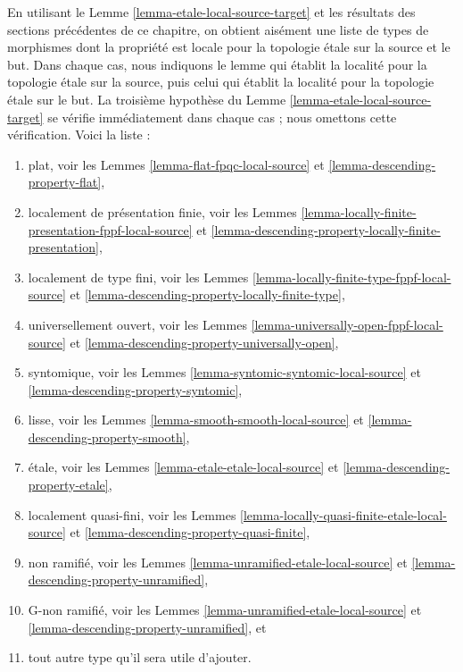 \begin{remark}
\label{remark-list-local-source-target}
En utilisant le Lemme \ref{lemma-etale-local-source-target} et les résultats
des sections précédentes de ce chapitre, on obtient aisément une liste de
types de morphismes dont la propriété est locale pour la topologie \'etale sur
la source et le but. Dans chaque cas, nous indiquons le lemme qui établit la
localité pour la topologie \'etale sur la source, puis celui qui établit la
localité pour la topologie \'etale sur le but. La troisième hypothèse du
Lemme \ref{lemma-etale-local-source-target} se vérifie immédiatement dans
chaque cas ; nous omettons cette vérification. Voici la liste :
\begin{enumerate}
\item plat, voir les Lemmes \ref{lemma-flat-fpqc-local-source} et
\ref{lemma-descending-property-flat},
\item localement de présentation finie, voir les Lemmes
\ref{lemma-locally-finite-presentation-fppf-local-source} et
\ref{lemma-descending-property-locally-finite-presentation},
\item localement de type fini, voir les Lemmes
\ref{lemma-locally-finite-type-fppf-local-source} et
\ref{lemma-descending-property-locally-finite-type},
\item universellement ouvert, voir les Lemmes
\ref{lemma-universally-open-fppf-local-source} et
\ref{lemma-descending-property-universally-open},
\item syntomique, voir les Lemmes \ref{lemma-syntomic-syntomic-local-source} et
\ref{lemma-descending-property-syntomic},
\item lisse, voir les Lemmes \ref{lemma-smooth-smooth-local-source} et
\ref{lemma-descending-property-smooth},
\item \'etale, voir les Lemmes \ref{lemma-etale-etale-local-source} et
\ref{lemma-descending-property-etale},
\item localement quasi-fini, voir les Lemmes
\ref{lemma-locally-quasi-finite-etale-local-source} et
\ref{lemma-descending-property-quasi-finite},
\item non ramifié, voir les Lemmes \ref{lemma-unramified-etale-local-source} et
\ref{lemma-descending-property-unramified},
\item G-non ramifié, voir les Lemmes
\ref{lemma-unramified-etale-local-source} et
\ref{lemma-descending-property-unramified}, et
\item tout autre type qu'il sera utile d'ajouter.
\end{enumerate}
\end{remark}

